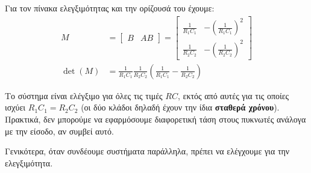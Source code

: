 \documentclass[11pt,a4paper,notitlepage,fleqn]{article}
\begin{document}
\begin{exercise}
	Για τον πίνακα ελεγξιμότητας και την ορίζουσά του έχουμε:
	\begin{align*}
	M &= \left[\begin{matrix}
	B & AB
	\end{matrix}\right] = \left[\begin{matrix}
	\frac{1}{R_1C_1} & -\left(\frac{1}{R_1C_1}\right)^2\\
	\frac{1}{R_2C_2} & -\left(\frac{1}{R_2C_2}\right)^2
	\end{matrix}\right]\\
	\det(M) &= \frac{1}{R_1C_1}\frac{1}{R_2C_2}\left(
	\frac{1}{R_1C_1}-\frac{1}{R_2C_2}
	\right)
	\end{align*}
	
	Το σύστημα είναι ελέγξιμο για όλες τις τιμές \( RC \), εκτός από
	αυτές για τις οποίες ισχύει \( R_1C_1 = R_2C_2 \) (οι δύο κλάδοι
	δηλαδή έχουν την ίδια \textbf{σταθερά χρόνου}). Πρακτικά, δεν μπορούμε
	να εφαρμόσουμε διαφορετική τάση στους πυκνωτές ανάλογα με την είσοδο,
	αν συμβεί αυτό.
\end{exercise}

Γενικότερα, όταν συνδέουμε συστήματα παράλληλα, πρέπει να ελέγχουμε για
την ελεγξιμότητα.
\end{document}
